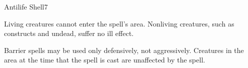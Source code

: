 \begin{spellsection}{Antilife Shell}{7}
\begin{spellheader}
\end{spellheader}
\begin{spellcontent}
    \begin{spelltargetinginfo}
    \end{spelltargetinginfo}
    \begin{spelleffects}
        \spelleffect Living creatures cannot enter the spell's area. Nonliving creatures, such as constructs and undead, suffer no ill effect.
        \spelldur \durlong \dismissable
    \end{spelleffects}
\end{spellcontent}
\begin{spellfooter}
    \spellnotes Barrier spells may be used only defensively, not aggressively. Creatures in the area at the time that the spell is cast are unaffected by the spell.
\end{spellfooter}
\end{spellsection}

